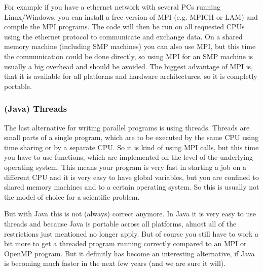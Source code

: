 For example if you have a ethernet network with
several PCs running Linux/Windows, you can install a free version of MPI
(e.g. MPICH or LAM) and compile the MPI programs. The code will then be run on all
requested CPUs using the ethernet protocol to communicate and exchange data.
On a shared memory machine (including SMP machines) 
you can also use MPI, but this time the communication could
be done directly, so using MPI for an SMP machine is usually a big overhead
and should be avoided. The biggest advantage of MPI is, that it is available
for all platforms and hardware architectures, so it is completly portable.

\subsubsection{(Java) Threads}
The last alternative for writing parallel programs is using threads. Threads are small
parts of a single program, which are to be executed by the same CPU using
time sharing or by a separate CPU. 
So it is kind of using MPI calls, but this time you have to use functions,
which are implemented on the level of the underlying operating system.
This means your program is very fast in starting a job on a different CPU
and it is very easy to have global variables, but you are confined to
shared memory machines and to a certain operating system. So this is usually
not the model of choice for a scientific problem. 

But with Java this is
not (always) correct anymore. In Java it is very easy to use threads and
because Java is portable across all platforms, almost all of 
the restrictions just mentioned no longer apply. 
But of course you still have to work a bit more to get a threaded
program running correctly compared to an MPI or OpenMP program. But it 
definitly has become an interesting alternative, if Java is becoming much
faster in the next few years (and we are sure it will).


